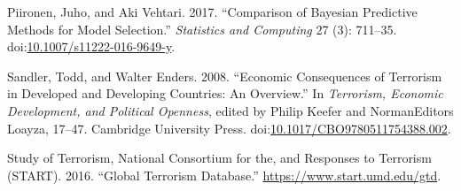 \documentclass[]{AEA}
\begin{document}
\hypertarget{ref-Piironen2017}{}
Piironen, Juho, and Aki Vehtari. 2017. ``Comparison of Bayesian
Predictive Methods for Model Selection.'' \emph{Statistics and
Computing} 27 (3): 711--35.
doi:\href{https://doi.org/10.1007/s11222-016-9649-y}{10.1007/s11222-016-9649-y}.

\hypertarget{ref-sandler_enders_2008}{}
Sandler, Todd, and Walter Enders. 2008. ``Economic Consequences of
Terrorism in Developed and Developing Countries: An Overview.'' In
\emph{Terrorism, Economic Development, and Political Openness}, edited
by Philip Keefer and NormanEditors Loayza, 17--47. Cambridge University
Press.
doi:\href{https://doi.org/10.1017/CBO9780511754388.002}{10.1017/CBO9780511754388.002}.

\hypertarget{ref-GTD}{}
Study of Terrorism, National Consortium for the, and Responses to
Terrorism (START). 2016. ``Global Terrorism Database.''
\url{https://www.start.umd.edu/gtd}.
\end{document}
